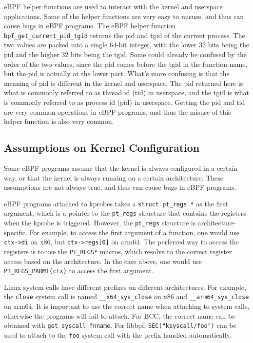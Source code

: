 eBPF helper functions are used to interact with the kernel and userspace applications.
Some of the helper functions are very easy to misuse, and thus can cause bugs in eBPF programs.
The eBPF helper function \texttt{bpf\_get\_current\_pid\_tgid} returns the pid and tgid of the current process.
The two values are packed into a single 64-bit integer, with the lower 32 bits being the pid and the higher 32 bits being the tgid.
Some could already be confused by the order of the two values, since the pid comes before the tgid in the function name, but the pid is actually at the lower part.
What's more confusing is that the meaning of pid is different in the kernel and userspace.
The pid returned here is what is commonly referred to as thread id (tid) in userspace, and the tgid is what is commonly referred to as process id (pid) in userspace.
Getting the pid and tid are very common operations in eBPF programs, and thus the misuse of this helper function is also very common. 



\subsection{Assumptions on Kernel Configuration}
Some eBPF programs assume that the kernel is always configured in a certain way, or that the kernel is always running on a certain architecture.
These assumptions are not always true, and thus can cause bugs in eBPF programs.

eBPF programs attached to kprobes takes a \texttt{struct pt\_regs *} as the first argument, which is a pointer to the \texttt{pt\_regs} structure that contains the registers when the kprobe is triggered.
However, the \texttt{pt\_regs} structure is architecture-specific. For example, to access the first argument of a function, one would use \texttt{ctx->di} on x86, but \texttt{ctx->regs[0]} on arm64.
The perferred way to access the registers is to use the \texttt{PT\_REGS*} macros, which resolve to the correct register access based on the architecture.
In the case above, one would use \texttt{PT\_REGS\_PARM1(ctx)} to access the first argument.

Linux system calls have different prefixes on different architectures. For example, the \texttt{close} system call is named \texttt{\_\_x64\_sys\_close} on x86 and \texttt{\_\_arm64\_sys\_close} on arm64.
It is important to use the correct name when attaching to system calls, otherwise the programs will fail to attach.
For BCC, the correct name can be obtained with \texttt{get\_syscall\_fnname}.
For libbpf, \texttt{SEC("ksyscall/foo")} can be used to attach to the \texttt{foo} system call with the prefix handled automatically.

